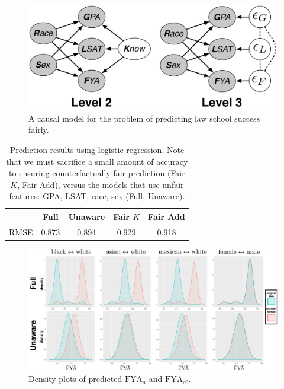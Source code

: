 \begin{figure}[th]
\begin{center}
\vspace{-1ex}
\centerline{\includegraphics[width=0.8\columnwidth]{law_school_model}}
\vspace{-2ex}
\caption{A causal model for the problem of predicting law school success fairly.\label{figure.law_school}\vspace{-2ex}}
\vspace{-2ex}
\end{center}
\end{figure}

\begin{table}
\centering
\caption{Prediction results using logistic regression. Note that we must sacrifice a small amount of accuracy to ensuring counterfactually fair prediction (Fair $K$, Fair Add), versus the models that use unfair features: GPA, LSAT, race, sex (Full, Unaware).}\label{table.pred_law}
\begin{tabular}{ccccc} 
\hline
 &  {\bf Full} & {\bf Unaware} & {\bf Fair $K$} & {\bf Fair Add} \\
\hline
RMSE & 0.873 & 0.894 & 0.929 & 0.918 \\
\hline
\end{tabular}
\end{table}

\begin{figure}[th]
\begin{center}
 \vspace{-1ex}
\centerline{\includegraphics[width=\columnwidth]{counterfactual}}
\vspace{-2ex}
\caption{Density plots of predicted $\mbox{FYA}_a$ and $\mbox{FYA}_{a'}$.\label{figure.counterfactual}}
\vspace{-2ex}
\end{center}
\end{figure}

